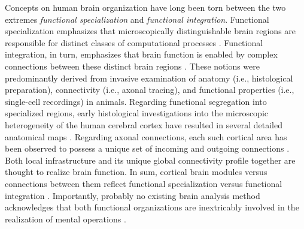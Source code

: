 \documentclass{article} %
\begin{document}
Concepts on human brain organization have long been torn
between the two extremes
\textit{functional specialization} and \textit{functional integration}.
Functional specialization emphasizes that microscopically distinguishable
brain regions are responsible for distinct classes of computational 
processes
\cite{kanwisher2010functional}.
Functional integration, in turn, emphasizes that brain function
is enabled by complex connections between these
distinct brain regions \cite{sporns14nn}.
%
These notions were predominantly derived from
invasive examination of anatomy (i.e., histological preparation),
connectivity (i.e., axonal tracing),
and functional properties
(i.e., single-cell recordings) in animals.
Regarding functional segregation into specialized regions,
early histological investigations into the microscopic heterogeneity of
the human cerebral cortex have resulted
in several detailed anatomical maps
\cite{brodmann1909vergleichende, vogt1919allgemeine}.
Regarding axonal connections,
each such cortical area has been observed
to possess a unique set of incoming and outgoing connections
\cite{passingham2002, young93monkey, scannell95cat}.
%
Both
local
infrastructure
and its unique global connectivity profile
together are thought to realize brain function.
%
In sum,
cortical brain modules versus connections between them
reflect 
functional specialization versus functional integration
\cite{friston2002beyond, mesulam_sensation}.
Importantly,
probably no existing brain analysis method acknowledges that
both functional organizations are inextricably involved
in the realization of mental operations
\cite{tononi1998complexity, saygin2012}.
\end{document}
